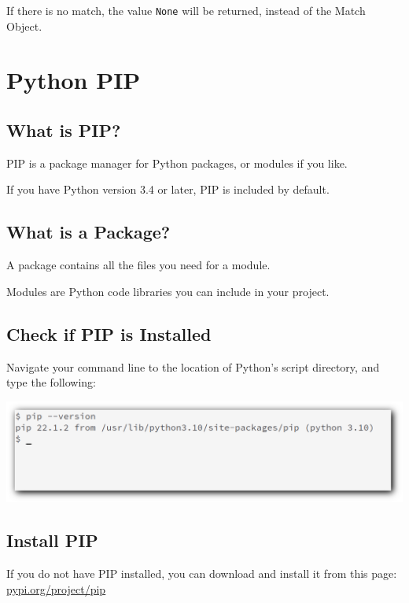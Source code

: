 \documentclass[12pt,a4paper]{article}
\newcommand{\lcode}[1]{%
	\lstinline{#1}%
}
\begin{document}
\begin{nbox}
If there is no match, the value \lcode{None} will be returned, instead of the
Match Object.
\end{nbox}
\vfill\newpage
\section{Python PIP}

\subsection{What is PIP?}

PIP is a package manager for Python packages, or modules if you like.

\begin{nbox}
If you have Python version 3.4 or later, PIP is included by default.
\end{nbox}
\subsection{What is a Package?}

A package contains all the files you need for a module.

Modules are Python code libraries you can include in your project.
\subsection{Check if PIP is Installed}

Navigate your command line to the location of Python's script directory, and
type the following:

\begin{center}
	\includegraphics[width=.8\textwidth]{shots/pip-check-exists.png}
\end{center}
\subsection{Install PIP}

If you do not have PIP installed, you can download and install it from this
page: \underline{\href{https://pypi.org/project/pip/}{pypi.org/project/pip}}
\end{document}
